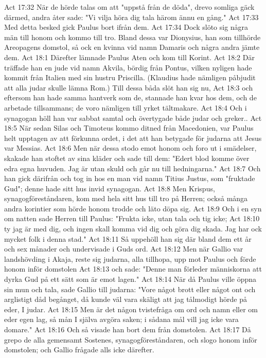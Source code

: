 Act 17:32  När de hörde talas om att "uppstå från de döda", drevo somliga gäck därmed, andra åter sade: "Vi vilja höra dig tala härom ännu en gång."
Act 17:33  Med detta besked gick Paulus bort ifrån dem.
Act 17:34  Dock slöto sig några män till honom och kommo till tro. Bland dessa var Dionysius, han som tillhörde Areopagens domstol, så ock en kvinna vid namn Damaris och några andra jämte dem.
Act 18:1  Därefter lämnade Paulus Aten och kom till Korint.
Act 18:2  Där träffade han en jude vid namn Akvila, bördig från Pontus, vilken nyligen hade kommit från Italien med sin hustru Priscilla. (Klaudius hade nämligen påbjudit att alla judar skulle lämna Rom.) Till dessa båda slöt han sig nu,
Act 18:3  och eftersom han hade samma hantverk som de, stannade han kvar hos dem, och de arbetade tillsammans; de voro nämligen till yrket tältmakare.
Act 18:4  Och i synagogan höll han var sabbat samtal och övertygade både judar och greker..
Act 18:5  När sedan Silas och Timoteus kommo ditned från Macedonien, var Paulus helt upptagen av att förkunna ordet, i det att han betygade för judarna att Jesus var Messias.
Act 18:6  Men när dessa stodo emot honom och foro ut i smädelser, skakade han stoftet av sina kläder och sade till dem: "Edert blod komme över edra egna huvuden. Jag är utan skuld och går nu till hedningarna."
Act 18:7  Och han gick därifrån och tog in hos en man vid namn Titius Justus, som "fruktade Gud"; denne hade sitt hus invid synagogan.
Act 18:8  Men Krispus, synagogföreståndaren, kom med hela sitt hus till tro på Herren; också många andra korintier som hörde honom trodde och läto döpa sig.
Act 18:9  Och i en syn om natten sade Herren till Paulus: "Frukta icke, utan tala och tig icke;
Act 18:10  ty jag är med dig, och ingen skall komma vid dig och göra dig skada. Jag har ock mycket folk i denna stad."
Act 18:11  Så uppehöll han sig där bland dem ett år och sex månader och undervisade i Guds ord.
Act 18:12  Men när Gallio var landshövding i Akaja, reste sig judarna, alla tillhopa, upp mot Paulus och förde honom inför domstolen
Act 18:13  och sade: "Denne man förleder människorna att dyrka Gud på ett sätt som är emot lagen."
Act 18:14  När då Paulus ville öppna sin mun och tala, sade Gallio till judarna: "Vore något brott eller något ont och arglistigt dåd begånget, då kunde väl vara skäligt att jag tålmodigt hörde på eder, I judar.
Act 18:15  Men är det någon tvistefråga om ord och namn eller om eder egen lag, så mån I själva avgöra saken; i sådana mål vill jag icke vara domare."
Act 18:16  Och så visade han bort dem från domstolen.
Act 18:17  Då grepo de alla gemensamt Sostenes, synagogföreståndaren, och slogo honom inför domstolen; och Gallio frågade alls icke därefter.
